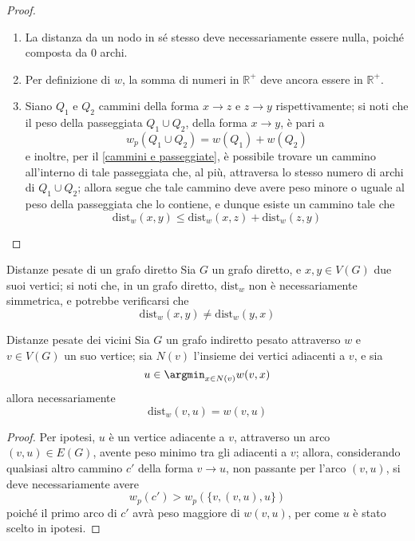 \documentclass[a4paper, 12pt]{report}
\begin{document}
    \begin{proof}
        \hspace{0.7cm}
        \begin{enumerate}[label=\roman*), font=\itshape]
            \item La distanza da un nodo in sé stesso deve necessariamente essere nulla, poiché composta da 0 archi.
            \item Per definizione di $w$, la somma di numeri in $\mathbb{R}^+$ deve ancora essere in $\mathbb{R}^+$.
            \item Siano $Q_1$ e $Q_2$ cammini della forma $x \rightarrow z$ e $z \rightarrow y$ rispettivamente; si noti che il peso della passeggiata $Q_1 \cup Q_2$, della forma $x \rightarrow y$, è pari a $$w_p(Q_1 \cup Q_2) = w(Q_1) + w(Q_2)$$ e inoltre, per il \cref{cammini e passeggiate}, è possibile trovare un cammino all'interno di tale passeggiata che, al più, attraversa lo stesso numero di archi di $Q_1 \cup Q_2$; allora segue che tale cammino deve avere peso minore o uguale al peso della passeggiata che lo contiene, e dunque esiste un cammino tale che $$\mathrm{dist}_w(x, y) \le \mathrm{dist}_w(x, z) + \mathrm{dist}_w(z, y)$$
        \end{enumerate}
    \end{proof}

    \begin{framedobs}{Distanze pesate di un grafo diretto}
        Sia $G$ un grafo diretto, e $x, y \in V(G)$ due suoi vertici; si noti che, in un grafo diretto, $\mathrm{dist}_w$ non è necessariamente simmetrica, e potrebbe verificarsi che $$\mathrm{dist}_w(x, y) \neq \mathrm{dist}_w(y, x)$$
    \end{framedobs}

    \begin{framedlem}{Distanze pesate dei vicini}
        \label{vicini pesati}
        Sia $G$ un grafo indiretto pesato attraverso $w$ e $v \in V(G)$ un suo vertice; sia $N(v)$ l'insieme dei vertici adiacenti a $v$, e sia $$u \in \argmin_{x \in N(v)}{w(v, x)}$$ allora necessariamente $$\mathrm{dist}_w(v, u) = w(v, u)$$
    \end{framedlem}

    \begin{proof}
        Per ipotesi, $u$ è un vertice adiacente a $v$, attraverso un arco $(v, u) \in E(G)$, avente peso minimo tra gli adiacenti a $v$; allora, considerando qualsiasi altro cammino $c'$ della forma $v \rightarrow u$, non passante per l'arco $(v, u)$, si deve necessariamente avere $$w_p(c') > w_p(\{v, (v, u), u\})$$ poiché il primo arco di $c'$ avrà peso maggiore di $w(v, u)$, per come $u$ è stato scelto in ipotesi.
    \end{proof}
\end{document}
